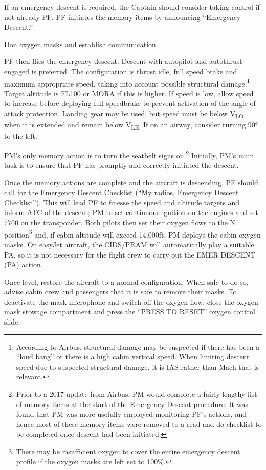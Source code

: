 \documentclass[a5paper,11pt,twoside]{book}
\newcommand{\V}[1]{V\textsubscript{#1}}
\begin{document}
If an emergency descent is required, the Captain should consider taking control
if not already PF. PF initiates the memory items by announcing “Emergency
Descent.”

Don oxygen masks and establish communication.

PF then flies the emergency descent.  Descent with autopilot and autothrust
engaged is preferred. The configuration is thrust idle, full speed brake and
maximum appropriate speed, taking into account possible structural
damage.\footnote{According to Airbus, structural damage may be suspected if
there has been a “loud bang” or there is a high cabin vertical speed. When
limiting descent speed due to suspected structural damage, it is IAS rather than
Mach that is relevant.} Target altitude is FL100 or MORA if this is higher. If
speed is low, allow speed to increase before deploying full speedbrake to
prevent activation of the angle of attack protection. Landing gear may be used,
but speed must be below \V{LO} when it is extended and remain below \V{LE}. If
on an airway, consider turning 90° to the left.

PM’s only memory action is to turn the seatbelt signs on.\footnote{Prior to a
2017 update from Airbus, PM would complete a fairly lengthy list of memory items
at the start of the Emergency Descent procedure. It was found that PM was more
usefully employed monitoring PF’s actions, and hence most of these memory items
were removed to a read and do checklist to be completed once descent had been
initiated.} Initially, PM’s main task is to ensure that PF has promptly and
correctly initiated the descent.

Once the memory actions are complete and the aircraft is descending, PF should
call for the Emergency Descent Checklist (“My radios, Emergency Descent
Checklist”). This will lead PF to finesse the speed and altitude targets and
inform ATC of the descent; PM to set continuous ignition on the engines and set
7700 on the transponder. Both pilots then set their oxygen flows to the N
position\footnote{There may be insufficient oxygen to cover the entire emergency
descent profile if the oxygen masks are left set to 100\%.} and, if cabin
altitude will exceed 14,000ft, PM deploys the cabin oxygen masks. On easyJet
aircraft, the CIDS/PRAM will automatically play a suitable PA, so it is not
necessary for the flight crew to carry out the EMER DESCENT (PA) action.

Once level, restore the aircraft to a normal configuration. When safe to do so,
advise cabin crew and passengers that it is safe to remove their masks. To
deactivate the mask microphone and switch off the oxygen flow, close the oxygen
mask stowage compartment and press the “PRESS TO RESET” oxygen control slide.
\end{document}
